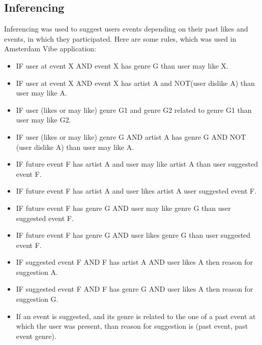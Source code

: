 \documentclass[12pt, a4paper, lithuanian]{article}
\begin{document}
\subsection{Inferencing}

Inferencing was used to suggest users events depending on their past likes and events, in which they participated. Here are some rules, which was used in Amsterdam Vibe application:

\begin{itemize}
  
    \item IF user at event X AND event X has genre G than user may like X.

    \item IF user at event X AND event X has artist A and NOT(user dislike A)  than user may like A.

    \item IF user (likes or may like) genre G1 and genre G2 related to genre G1 than user may like G2.

    \item IF user (likes or may like) genre G AND artist A has genre G AND NOT (user dislike A) than user may like A.

    \item IF future event F has artist A and user may like artist A than user suggested event F.

    \item IF future event F has artist A and user likes artist A user suggested event F.

    \item IF future event F has genre G AND user may like genre G than user suggested event F.
  
    \item IF future event F has genre G AND user likes genre G than user suggested event F.

    \item IF suggested event F AND F has artist A AND user likes A then reason for suggestion A.

    \item IF suggested event F AND F has genre G AND user likes A then reason for suggestion G.

    \item If an event is suggested, and its genre is related to the one of a past event at which the user was present,  than reason for suggestion is (past event, past event genre).

\end{itemize}
\end{document}
